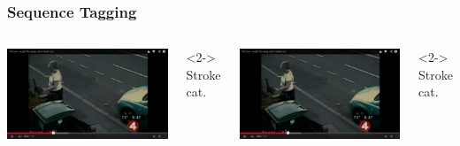 \documentclass{beamer}
\begin{document}
    \begin{frame}
        \frametitle{Sequence Tagging}
        \begin{columns}[t]
            \includegraphics[width=\linewidth]{images/stroke1}\\
            \begin{visibleenv}<2->
                \tiny{Stroke cat.}
            \end{visibleenv}

            \includegraphics[width=\linewidth]{images/stroke2}\\
            \begin{visibleenv}<2->
            \tiny Stroke cat.
            \end{visibleenv}


\end{columns}
\end{frame}
\end{document}
